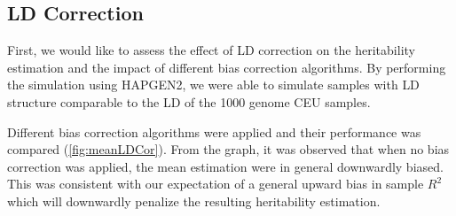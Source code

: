 		\subsection{LD Correction}
		First, we would like to assess the effect of \gls{LD} correction on the heritability estimation and the impact of different bias correction algorithms. 
		By performing the simulation using HAPGEN2, we were able to simulate samples with \gls{LD} structure comparable to the \gls{LD} of the 1000 genome \gls{CEU} samples.
		
		Different bias correction algorithms were applied and their performance was compared (\cref{fig:meanLDCor}).
		From the graph, it was observed that when no bias correction was applied, the mean estimation were in general downwardly biased.
		This was consistent with our expectation of a general upward bias in sample $R^2$ which will downwardly penalize the resulting heritability estimation.
